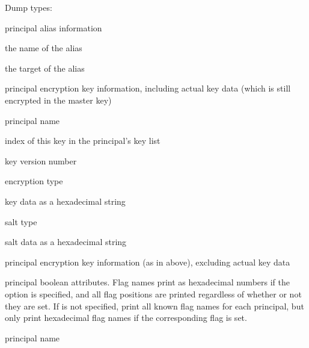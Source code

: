 \documentclass[letterpaper,10pt,english]{sphinxmanual}
\begin{document}
\sphinxAtStartPar
Dump types:
\begin{description}
\sphinxAtStartPar
principal alias information
\begin{description}
\sphinxAtStartPar
the name of the alias

\sphinxAtStartPar
the target of the alias

\end{description}

\sphinxAtStartPar
principal encryption key information, including actual key data
(which is still encrypted in the master key)
\begin{description}
\sphinxAtStartPar
principal name

\sphinxAtStartPar
index of this key in the principal’s key list

\sphinxAtStartPar
key version number

\sphinxAtStartPar
encryption type

\sphinxAtStartPar
key data as a hexadecimal string

\sphinxAtStartPar
salt type

\sphinxAtStartPar
salt data as a hexadecimal string

\end{description}

\sphinxAtStartPar
principal encryption key information (as in  above),
excluding actual key data

\sphinxAtStartPar
principal boolean attributes.  Flag names print as hexadecimal
numbers if the  option is specified, and all flag positions
are printed regardless of whether or not they are set.  If 
is not specified, print all known flag names for each principal,
but only print hexadecimal flag names if the corresponding flag is
set.
\begin{description}
\sphinxAtStartPar
principal name


\end{description}
\end{description}
\end{document}
